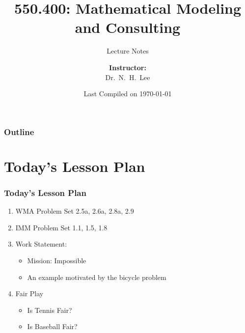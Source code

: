\documentclass[hyperref={colorlinks=false},compress,handout,10pt]{beamer}
\title{{\color{blue} \LARGE 550.400: Mathematical Modeling and Consulting\newline} }
\subtitle{{\color{red} \large Lecture Notes} }
\author{ 
    {\bf{Instructor:}} \\ 
Dr.~N.~H.~Lee \\ 
    \vspace{5pt}
}
\institute{JHU AMS 2012 FALL}
\date{\mygreen Last Compiled on \today}
\let\olditem\item
\renewcommand{\item}{\setlength{\itemsep}{0.5\baselineskip}\olditem}
\begin{document}
\begin{frame}[plain]
  \titlepage
\end{frame}

\begin{frame}
  \frametitle{Outline}
  \tableofcontents
\end{frame}

\section{Today's Lesson Plan}
\begin{frame}%
    \frametitle{Today's Lesson Plan}
    \begin{enumerate}
        \item WMA Problem Set 2.5a, 2.6a, 2.8a, 2.9
        \item IMM Problem Set 1.1, 1.5, 1.8
        \item Work Statement: 
            \begin{itemize}
                \item Mission: Impossible
                \item An example motivated by the bicycle problem
            \end{itemize}
        \item Fair Play
             \begin{itemize}
                 \item Is Tennis Fair? 
                 \item Is Baseball Fair?
             \end{itemize}
    \end{enumerate} \end{frame}









\end{document}
